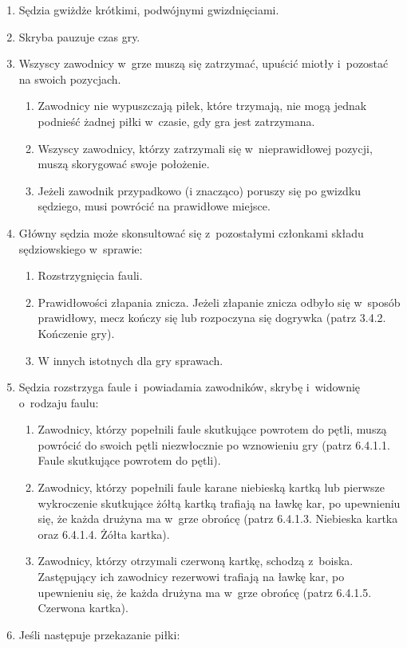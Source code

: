 \documentclass[12pt,a4paper]{article}
\begin{document}
\begin{enumerate}
	\item
	      Sędzia gwiżdże krótkimi, podwójnymi gwizdnięciami.
	\item
	      Skryba pauzuje czas gry.
	\item
	      Wszyscy zawodnicy w~grze muszą się zatrzymać, upuścić miotły i~pozostać na swoich pozycjach.

	      \begin{enumerate}
		      \item
		            Zawodnicy nie wypuszczają piłek, które trzymają, nie mogą jednak
		            podnieść żadnej piłki w~czasie, gdy gra jest zatrzymana.
		      \item
		            Wszyscy zawodnicy, którzy zatrzymali się w~nieprawidłowej pozycji,
		            muszą skorygować swoje położenie.
		      \item
		            Jeżeli zawodnik przypadkowo (i znacząco) poruszy się po gwizdku
		            sędziego, musi powrócić na prawidłowe miejsce.
	      \end{enumerate}
	\item
	      Główny sędzia może skonsultować się z~pozostałymi członkami składu
	      sędziowskiego w~sprawie:

	      \begin{enumerate}
		      \item
		            Rozstrzygnięcia fauli.
		      \item
		            Prawidłowości złapania znicza. Jeżeli złapanie znicza odbyło się w~sposób prawidłowy, mecz kończy się lub rozpoczyna się dogrywka
		            (patrz 3.4.2. Kończenie gry).
		      \item
		            W innych istotnych dla gry sprawach.
	      \end{enumerate}
	\item
	      Sędzia rozstrzyga faule i~powiadamia zawodników, skrybę i~widownię o~rodzaju faulu:

	      \begin{enumerate}
		      \item
		            Zawodnicy, którzy popełnili faule skutkujące powrotem do pętli,
		            muszą powrócić do swoich pętli niezwłocznie po wznowieniu gry (patrz
		            6.4.1.1. Faule skutkujące powrotem do pętli).
		      \item
		            Zawodnicy, którzy popełnili faule karane niebieską kartką lub
		            pierwsze wykroczenie skutkujące żółtą kartką trafiają na ławkę kar,
		            po upewnieniu się, że każda drużyna ma w~grze obrońcę (patrz 6.4.1.3.
		            Niebieska kartka oraz 6.4.1.4. Żółta kartka).
		      \item
		            Zawodnicy, którzy otrzymali czerwoną kartkę, schodzą z~boiska.
		            Zastępujący ich zawodnicy rezerwowi trafiają na ławkę kar, po
		            upewnieniu się, że każda drużyna ma w~grze obrońcę (patrz 6.4.1.5.
		            Czerwona kartka).
	      \end{enumerate}
	\item
	      Jeśli następuje przekazanie piłki:


\end{enumerate}
\end{document}
